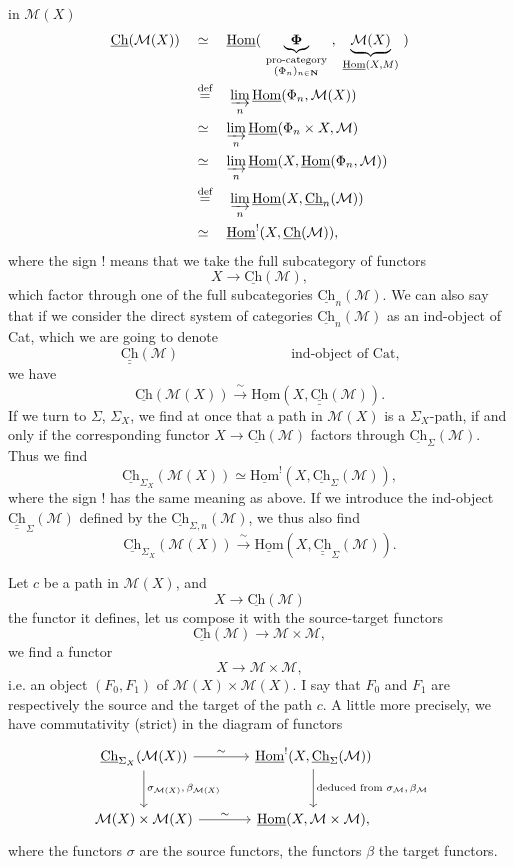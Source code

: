 \documentclass[11pt]{article}
\newcommand{\printedpage}[1]{\marginpar{\footnotesize p.~#1}}
\newcommand{\msp}[1]{\marginpar{\footnotesize [#1]}}
\newcommand{\cM}{\mathcal{M}}
\newcommand{\Ch}{\underline{\mathrm{Ch}}}
\newcommand{\Chh}{\underline{\underline{\mathrm{Ch}}}}
\newcommand{\dfeq}{\overset{\text{def}}{=}}
\newcommand{\uHom}{\underline{\mathrm{Hom}}}
\begin{document}
\printedpage{19}

in $\cM(X)$
\[
\begin{aligned}
\Ch(\cM(X)) \quad &\simeq \quad \uHom(\ \underbrace{\boldsymbol{\Phi}}_{\substack{\text{pro-category}\\ (\Phi_n)_{n\in\mathbf{N}}}}\ ,\ \underbrace{\cM(X)}_{\uHom(X,M)}\ ) \\ %
&\dfeq \quad \varinjlim_n \uHom(\Phi_n,\cM(X)) \\
&\simeq \quad \varinjlim_n \uHom(\Phi_n\times X,\cM) \\
&\simeq \quad \varinjlim_n \uHom(X,\uHom(\Phi_n,\cM)) \\
&\dfeq \quad \varinjlim_n \uHom(X,\Ch_n(\cM)) \\
&\simeq \quad \uHom^{!}(X,\Ch(\cM)),
\end{aligned}
\]
where the sign ! means that we take the full subcategory of functors
\[
X\longrightarrow \Ch(\cM),
\]
\msp{page 30}
which factor through one of the full subcategories $\Ch_n(\cM)$. We can also say that if we consider the direct system of categories $\Ch_n(\cM)$ as an ind-object of Cat, which we are going to denote
\[
\Chh(\cM) \qquad\qquad\qquad\qquad \text{ind-object of Cat,}
\]
we have
\[
\Ch(\cM(X)) \xrightarrow{\ \sim\ } \uHom(X,\Chh(\cM)).
\]
If we turn to $\Sigma$, $\Sigma_X$, we find at once that a path in $\cM(X)$ is a $\Sigma_X$-path, if and only if the corresponding functor $X\longrightarrow\Ch(\cM)$ factors through $\Ch_{\Sigma}(\cM)$. Thus we find
\[
\Ch_{\Sigma_X}(\cM(X))\simeq\uHom^{!}(X,\Ch_{\Sigma}(\cM)),
\]
where the sign ! has the same meaning as above. If we introduce the ind-object $\Chh_{\Sigma}(\cM)$ defined by the $\Ch_{\Sigma,n}(\cM)$, we thus also find
\[
\Ch_{\Sigma_X}(\cM(X))\xrightarrow{\ \sim\ }\uHom(X,\Chh_{\Sigma}(\cM)).
\]

\msp{page 31}
Let $c$ be a path in $\cM(X)$, and
\[
X\longrightarrow\Ch(\cM)
\]
the functor it defines, let us compose it with the source-target functors
\[
\Ch(\cM)\longrightarrow\cM\times\cM,
\]
we find a functor
\[
X\longrightarrow\cM\times\cM,
\]
i.e. an object $(F_0,F_1)$ of $\cM(X)\times\cM(X)$. I say that $F_0$ and $F_1$ are respectively the source and the target of the path $c$. A little more precisely, we have commutativity (strict) in the diagram of functors
\printedpage{20}
\[
\begin{tikzcd}[column sep=large, row sep=large]
\Ch_{\Sigma_X}(\cM(X)) \arrow[r, "\sim"] \arrow[d, "{\sigma_{\cM(X)},\,\beta_{\cM(X)}}"] & \uHom^{!}(X,\Ch_{\Sigma}(\cM)) \arrow[d, "{\text{deduced from }\sigma_{\cM},\,\beta_{\cM}}"] \\
\cM(X)\times\cM(X) \arrow[r, "\sim"] & \uHom(X,\cM\times\cM),
\end{tikzcd}
\]
where the functors $\sigma$ are the source functors, the functors $\beta$ the target functors.
\end{document}
